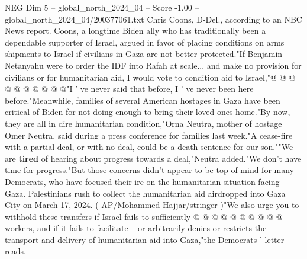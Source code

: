 \begin{textsample}{NEG Dim 5 – global\_north\_2024\_04 – Score -1.00 – global\_north\_2024\_04/200377061.txt}
Chris Coons, D-Del., according to an NBC News report.
Coons, a longtime Biden ally who has traditionally been a dependable supporter of Israel, argued in favor of placing conditions on arms shipments to Israel if civilians in Gaza are not better protected."If Benjamin Netanyahu were to order the IDF into Rafah at scale... and make no provision for civilians or for humanitarian aid, I would vote to condition aid to Israel,"@ @ @ @ @ @ @ @ @ @"I ' ve never said that before, I ' ve never been here before."Meanwhile, families of several American hostages in Gaza have been critical of Biden for not doing enough to bring their loved ones home."By now, they are all in dire humanitarian condition,"Orna Neutra, mother of hostage Omer Neutra, said during a press conference for families last week."A cease-fire with a partial deal, or with no deal, could be a death sentence for our son.""We are \textbf{tired} of hearing about progress towards a deal,"Neutra added."We don't have time for progress."But those concerns didn't appear to be top of mind for many Democrats, who have focused their ire on the humanitarian situation facing Gaza.
Palestinians rush to collect the humanitarian aid airdropped into Gaza City on March 17, 2024. ( AP/Mohammed Hajjar/stringer )"We also urge you to withhold these transfers if Israel fails to sufficiently @ @ @ @ @ @ @ @ @ @ workers, and if it fails to facilitate -- or arbitrarily denies or restricts the transport and delivery of humanitarian aid into Gaza,"the Democrats ' letter reads.

\end{textsample}
